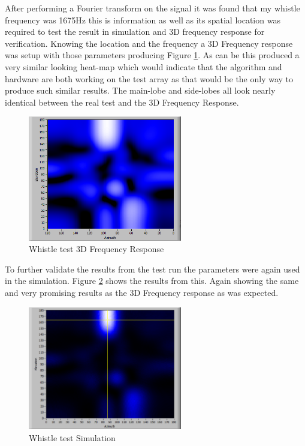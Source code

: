 \documentclass{UoNMCHA}
\numberwithin{equation}{section}
\begin{document}
    After performing a Fourier transform on the signal it was found that my whistle frequency was 1675Hz this is information as well as its spatial location was required to test the result in simulation and 3D frequency response for verification. Knowing the location and the frequency a 3D Frequency response was setup with those parameters producing Figure \ref{fig:RealWhistleFreq}. As can be this produced a very similar looking heat-map which would indicate that the algorithm and hardware are both working on the test array as that would be the only way to produce such similar results. The main-lobe and side-lobes all look nearly identical between the real test and the 3D Frequency Response.
    
    \begin{figure} [H]
        \centering
        \includegraphics[keepaspectratio, width = 0.6\textwidth]{Figures/RealWhistle3DFreqResp.png}
        \caption{Whistle test 3D Frequency Response}
        \label{fig:RealWhistleFreq}
    \end{figure}
    
    To further validate the results from the test run the parameters were again used in the simulation. Figure \ref{fig:RealWhistleSim} shows the results from this. Again showing the same and very promising results as the 3D Frequency response as was expected.
    
     \begin{figure} [H]
        \centering
        \includegraphics[keepaspectratio, width = 0.6\textwidth]{Figures/RealWhistleSim.png}
        \caption{Whistle test Simulation}
        \label{fig:RealWhistleSim}
    \end{figure}
\end{document}
